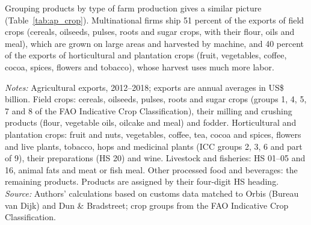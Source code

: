 Grouping products by type of farm production gives a similar picture (Table~\ref{tab:ap_crop}). Multinational
firms ship 51 percent of the exports of field crops (cereals, oilseeds, pulses, roots and sugar crops, with their
flour, oils and meal), which are grown on large areas and harvested by machine, and 40 percent of the exports of
horticultural and plantation crops (fruit, vegetables, coffee, cocoa, spices, flowers and tobacco), whose harvest
uses much more labor.
\begin{table}[htbp]
\centering
\caption{Agricultural exports and multinational shares, by type of production}
\label{tab:ap_crop}
{\small\setlength{\tabcolsep}{4pt}\setlength{\extrarowheight}{1pt}
}

\begin{minipage}{0.95\linewidth}
\notesize
\vspace{0.6em}
\textit{Notes:} Agricultural exports, 2012--2018; exports are annual averages in US\$ billion. Field crops: cereals, oilseeds, pulses, roots and sugar crops (groups 1, 4, 5, 7 and 8 of the FAO Indicative Crop Classification), their milling and crushing products (flour, vegetable oils, oilcake and meal) and fodder. Horticultural and plantation crops: fruit and nuts, vegetables, coffee, tea, cocoa and spices, flowers and live plants, tobacco, hops and medicinal plants (ICC groups 2, 3, 6 and part of 9), their preparations (HS 20) and wine. Livestock and fisheries: HS 01--05 and 16, animal fats and meat or fish meal. Other processed food and beverages: the remaining products. Products are assigned by their four-digit HS heading.\\
\textit{Source:} Authors' calculations based on customs data matched to Orbis (Bureau van Dijk) and Dun \& Bradstreet; crop groups from the FAO Indicative Crop Classification.
\end{minipage}
\end{table}
